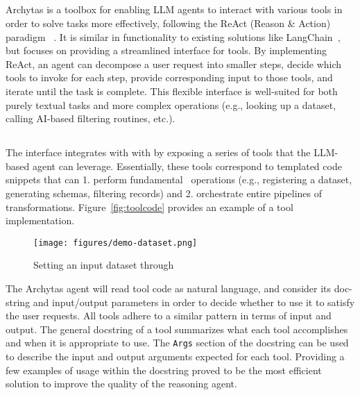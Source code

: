 \subsection{\archytas{}}
\label{sec:chat}



Archytas is a toolbox for enabling LLM agents to interact with various tools in order to solve tasks more effectively, following the ReAct (Reason \& Action) paradigm ~\cite{yao2022react}. 
It is similar in functionality to existing solutions like LangChain~\cite{langchain}, but focuses on providing a streamlined interface for tools. 
By implementing ReAct, an agent can decompose a user request into smaller steps, decide which tools to invoke for each step, provide corresponding input to those tools, and iterate until the task is complete. 
This flexible interface is well-suited for both purely textual tasks and more complex operations (e.g., looking up a dataset, calling AI-based filtering routines, etc.).

\subsection{\chat{}}
The \chat{} interface integrates with \system{} with \archytas{} by exposing a series of tools that the LLM-based agent can leverage. 
Essentially, these tools 
correspond to templated code snippets that can 1. perform fundamental \sys\ operations (e.g., registering a dataset, generating schemas, filtering records) and 2. orchestrate entire pipelines of transformations.
Figure~\ref{fig:toolcode} provides an example of a tool implementation.

% 

\begin{figure}[t]
    \centering
    \texttt{[image: figures/demo-dataset.png]}
    \caption{Setting an input dataset through \chat{}}
    \label{fig:dataset_ops}
\end{figure}

The Archytas agent will read tool code as natural language, and consider its doc-string and input/output parameters in order to decide whether to use it to satisfy the user requests.
All tools adhere to a similar pattern in terms of input and output. The general docstring of a tool summarizes what each tool accomplishes and when it is appropriate to use.
The \texttt{Args} section of the docstring can be used to describe the input and output arguments expected for each tool.
Providing a few examples of usage within the docstring proved to be the most efficient solution to improve the quality of the reasoning agent.

